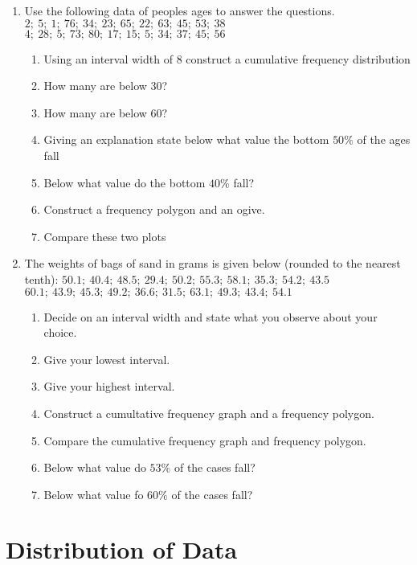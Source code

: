 {
\begin{enumerate}
\item Use the following data of peoples ages to answer the questions. \newline
$2;~ 5;~1;~ 76;~ 34;~ 23; ~65; ~22;~ 63;~ 45;~ 53; ~38 $\newline
$4; ~28; ~5; ~73; ~80; ~17; ~15; ~5; ~34; ~37;~ 45; ~56 $
	\begin{enumerate}
	\item Using an interval width of $8$ construct a cumulative frequency distribution 
	\item How many are below $30$?
	\item How many are below $60$?
	\item Giving an explanation state below what value the bottom $50\%$ of the ages fall
	\item Below what value do the bottom $40\%$ fall?
	\item Construct a frequency polygon and an ogive. 
	\item Compare these two plots
	\end{enumerate}
\item The weights of bags of sand in grams is given below (rounded to the nearest tenth): \newline
$50.1;~ 40.4; ~48.5;~ 29.4; ~50.2; ~55.3;~ 58.1;~ 35.3;~ 54.2;~ 43.5$ \newline
$60.1; ~43.9;~ 45.3; ~49.2; ~36.6; ~31.5; ~63.1; ~49.3;~ 43.4; ~54.1$ 
	\begin{enumerate}
	\item Decide on an interval width and state what you observe about your choice.
	\item Give your lowest interval. 
	\item Give your highest interval.
	\item Construct a cumultative frequency graph and a frequency polygon.
	\item Compare the cumulative frequency graph and frequency polygon.
	\item Below what value do $53\%$ of the cases fall?
	\item Below what value fo $60\%$ of the cases fall?
	\end{enumerate}
\end{enumerate}
}

\section{Distribution of Data}

